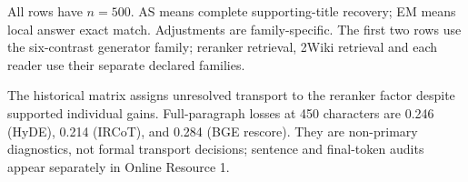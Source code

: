 \begin{table}[t]
\begin{threeparttable}
\begin{tabularx}{\textwidth}
\bottomrule
\end{tabularx}
\begin{tablenotes}
\footnotesize
\item All rows have $n=500$. AS means complete supporting-title recovery; EM means local answer exact match. Adjustments are family-specific. The first two rows use the six-contrast generator family; reranker retrieval, 2Wiki retrieval and each reader use their separate declared families.
\item The historical matrix assigns unresolved transport to the reranker factor despite supported individual gains. Full-paragraph losses at 450 characters are 0.246 (HyDE), 0.214 (IRCoT), and 0.284 (BGE rescore). They are non-primary diagnostics, not formal transport decisions; sentence and final-token audits appear separately in Online Resource 1.
\end{tablenotes}
\end{threeparttable}
\end{table}
